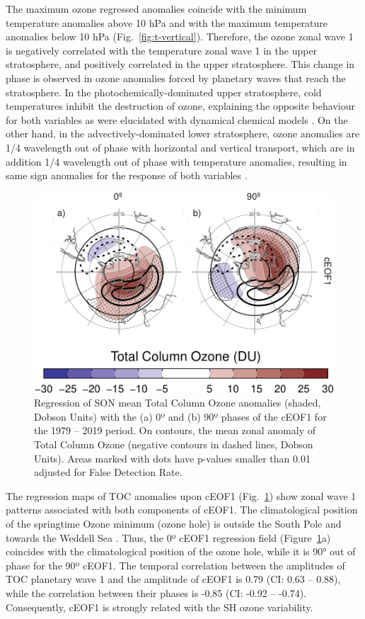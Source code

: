 \documentclass[pdflatex,lineno,sn-basic]{sn-jnl}
\theoremstyle{thmstyleone}%
\theoremstyle{thmstyletwo}%
\theoremstyle{thmstylethree}%
\begin{document}
The maximum ozone regressed anomalies coincide with the minimum temperature anomalies above 10 hPa and with the maximum temperature anomalies below 10 hPa (Fig.~\ref{fig:t-vertical}).
Therefore, the ozone zonal wave 1 is negatively correlated with the temperature zonal wave 1 in the upper stratosphere, and positively correlated in the upper stratosphere.
This change in phase is observed in ozone anomalies forced by planetary waves that reach the stratosphere.
In the photochemically-dominated upper stratosphere, cold temperatures inhibit the destruction of ozone, explaining the opposite behaviour for both variables as were elucidated with dynamical chemical models \citep{hartmann1979, wirth1993, smith1995}.
On the other hand, in the advectively-dominated lower stratosphere, ozone anomalies are 1/4 wavelength out of phase with horizontal and vertical transport, which are in addition 1/4 wavelength out of phase with temperature anomalies, resulting in same sign anomalies for the response of both variables \citep{hartmann1979, wirth1993, smith1995}.



\begin{figure}
\centering
\includegraphics{shceof_files/figure-latex/o3-regr-1.pdf}
\caption{\label{fig:o3-regr}Regression of SON mean Total Column Ozone anomalies (shaded, Dobson Units) with the (a) 0º and (b) 90º phases of the cEOF1 for the 1979 -- 2019 period. On contours, the mean zonal anomaly of Total Column Ozone (negative contours in dashed lines, Dobson Units). Areas marked with dots have p-values smaller than 0.01 adjusted for False Detection Rate.}
\end{figure}



The regression maps of TOC anomalies upon cEOF1 (Fig.~\ref{fig:o3-regr}) show zonal wave 1 patterns associated with both components of cEOF1.
The climatological position of the springtime Ozone minimum (ozone hole) is outside the South Pole and towards the Weddell Sea \citep[e.g.][]{grytsai2011}.
Thus, the 0º cEOF1 regression field (Figure~\ref{fig:o3-regr}a) coincides with the climatological position of the ozone hole, while it is 90° out of phase for the 90º cEOF1.
The temporal correlation between the amplitudes of TOC planetary wave 1 and the amplitude of cEOF1 is 0.79 (CI: 0.63 -- 0.88), while the correlation between their phases is -0.85 (CI: -0.92 -- -0.74).
Consequently, cEOF1 is strongly related with the SH ozone variability.
\end{document}
